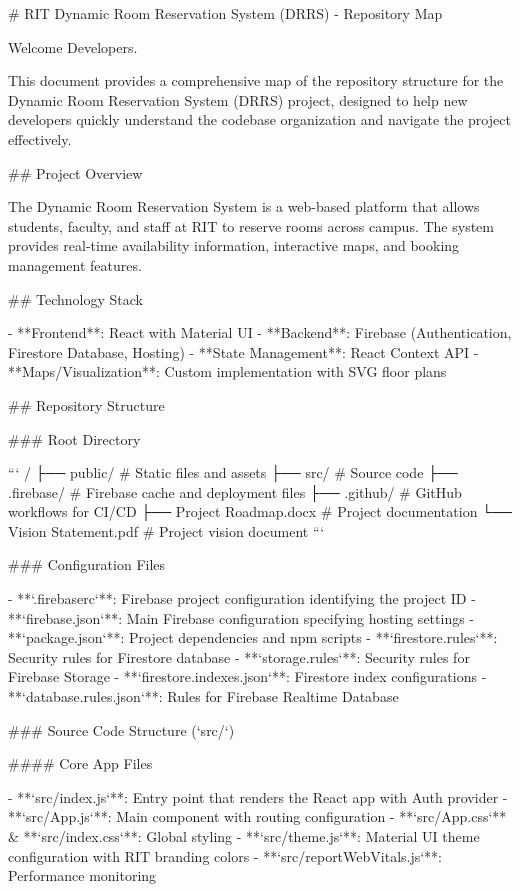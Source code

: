 # RIT Dynamic Room Reservation System (DRRS) - Repository Map

Welcome Developers.

This document provides a comprehensive map of the repository structure for the Dynamic Room Reservation System (DRRS) project, designed to help new developers quickly understand the codebase organization and navigate the project effectively.

## Project Overview

The Dynamic Room Reservation System is a web-based platform that allows students, faculty, and staff at RIT to reserve rooms across campus. The system provides real-time availability information, interactive maps, and booking management features.

## Technology Stack

- **Frontend**: React with Material UI
- **Backend**: Firebase (Authentication, Firestore Database, Hosting)
- **State Management**: React Context API
- **Maps/Visualization**: Custom implementation with SVG floor plans

## Repository Structure

### Root Directory

```
/
├── public/                   # Static files and assets
├── src/                      # Source code 
├── .firebase/                # Firebase cache and deployment files
├── .github/                  # GitHub workflows for CI/CD
├── Project Roadmap.docx      # Project documentation
└── Vision Statement.pdf      # Project vision document
```

### Configuration Files

- **`.firebaserc`**: Firebase project configuration identifying the project ID
- **`firebase.json`**: Main Firebase configuration specifying hosting settings
- **`package.json`**: Project dependencies and npm scripts
- **`firestore.rules`**: Security rules for Firestore database
- **`storage.rules`**: Security rules for Firebase Storage
- **`firestore.indexes.json`**: Firestore index configurations
- **`database.rules.json`**: Rules for Firebase Realtime Database

### Source Code Structure (`src/`)

#### Core App Files

- **`src/index.js`**: Entry point that renders the React app with Auth provider
- **`src/App.js`**: Main component with routing configuration
- **`src/App.css`** & **`src/index.css`**: Global styling
- **`src/theme.js`**: Material UI theme configuration with RIT branding colors
- **`src/reportWebVitals.js`**: Performance monitoring

